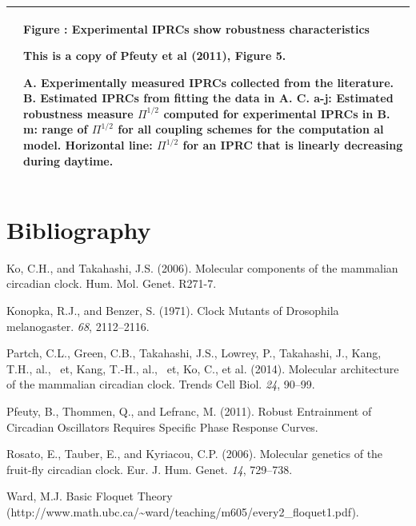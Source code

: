 \documentclass[letterpaper]{article}
\newcounter{Figure}
\renewcommand\theFigure{\arabic{Figure}}
\begin{document}
\bigskip


\bigskip

\begin{flushleft}
\tablehead{}
\begin{supertabular}{|m{3.49346in}|m{3.3490598in}|}
  &
{\bfseries Figure \stepcounter{Figure}{\theFigure}: Experimental IPRCs
show robustness characteristics}

This is a copy of Pfeuty et al (2011), Figure 5.

A. Experimentally measured IPRCs collected from the literature. B.
Estimated IPRCs from fitting the data in A. C. a-j: Estimated
robustness measure  ${\Pi }^{1/2}$ computed for experimental IPRCs in
B. m: range of  ${\Pi }^{1/2}$ for all coupling schemes for the
computation al model. Horizontal line:  ${\Pi }^{1/2}$ for an IPRC
that is linearly decreasing during daytime. \\\hline
\end{supertabular}
\end{flushleft}

\bigskip


\bigskip

\section{Bibliography}
Ko, C.H., and Takahashi, J.S. (2006). Molecular components of the
mammalian circadian clock. Hum. Mol. Genet. R271-7.

Konopka, R.J., and Benzer, S. (1971). Clock Mutants of Drosophila
melanogaster. \textit{68}, 2112–2116.

Partch, C.L., Green, C.B., Takahashi, J.S., Lowrey, P., Takahashi, J.,
Kang, T.H., al., \ et, Kang, T.-H., al., \ et, Ko, C., et al. (2014).
Molecular architecture of the mammalian circadian clock. Trends Cell
Biol. \textit{24}, 90–99.

Pfeuty, B., Thommen, Q., and Lefranc, M. (2011). Robust Entrainment of
Circadian Oscillators Requires Specific Phase Response Curves.

Rosato, E., Tauber, E., and Kyriacou, C.P. (2006). Molecular genetics
of the fruit-fly circadian clock. Eur. J. Hum. Genet. \textit{14},
729–738.

Ward, M.J. Basic Floquet Theory
(http://www.math.ubc.ca/\~{}ward/teaching/m605/every2\_floquet1.pdf).


\bigskip
\end{document}
